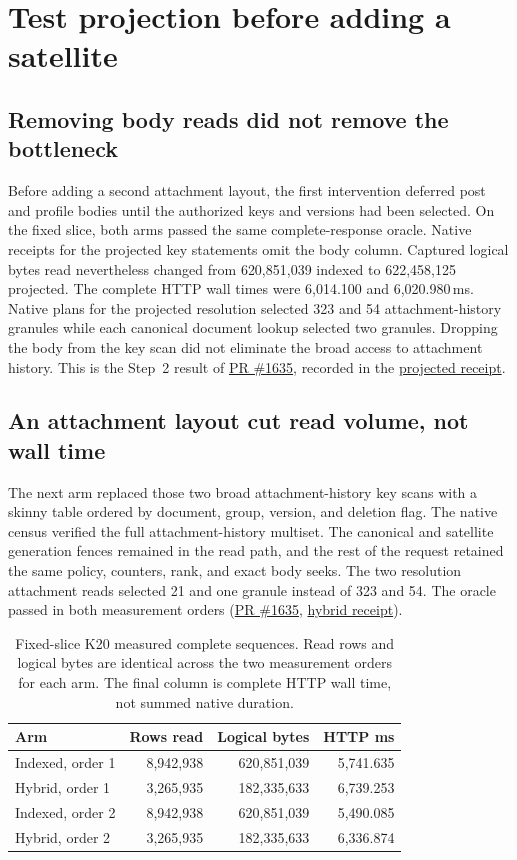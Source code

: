 \documentclass[sigconf,nonacm]{acmart}
\newcommand{\pr}[1]{\href{https://github.com/jacoby149/web10/pull/#1}{PR \##1}}
\newcommand{\record}[2]{\href{https://github.com/jacoby149/web10/blob/2f397cb13/research/experiments/costfn/#1}{#2}}
\begin{document}
\section{Test projection before adding a satellite}
\subsection{Removing body reads did not remove the bottleneck}
Before adding a second attachment layout, the first intervention deferred post and profile bodies until the authorized keys and versions had been selected. On the fixed slice, both arms passed the same complete-response oracle. Native receipts for the projected key statements omit the body column. Captured logical bytes read nevertheless changed from 620,851,039 indexed to 622,458,125 projected. The complete HTTP wall times were 6,014.100 and 6,020.980\,ms. Native plans for the projected resolution selected 323 and 54 attachment-history granules while each canonical document lookup selected two granules. Dropping the body from the key scan did not eliminate the broad access to attachment history. This is the Step~2 result of \pr{1635}, recorded in the \record{evidence/k20-projected-20261125/RESULTS.md}{projected receipt}.

\subsection{An attachment layout cut read volume, not wall time}
The next arm replaced those two broad attachment-history key scans with a skinny table ordered by document, group, version, and deletion flag. The native census verified the full attachment-history multiset. The canonical and satellite generation fences remained in the read path, and the rest of the request retained the same policy, counters, rank, and exact body seeks. The two resolution attachment reads selected 21 and one granule instead of 323 and 54. The oracle passed in both measurement orders (\pr{1635}, \record{evidence/k20-attachment-20261125/RESULTS.md}{hybrid receipt}).

\begin{table}[t]
\caption{Fixed-slice K20 measured complete sequences. Read rows and logical bytes are identical across the two measurement orders for each arm. The final column is complete HTTP wall time, not summed native duration.}
\label{tab:hybrid}
\small
\setlength{\tabcolsep}{4pt}
\begin{tabular}{@{}lrrr@{}}
\toprule
Arm & Rows read & Logical bytes & HTTP ms \\
\midrule
Indexed, order 1 & 8,942,938 & 620,851,039 & 5,741.635 \\
Hybrid, order 1 & 3,265,935 & 182,335,633 & 6,739.253 \\
Indexed, order 2 & 8,942,938 & 620,851,039 & 5,490.085 \\
Hybrid, order 2 & 3,265,935 & 182,335,633 & 6,336.874 \\
\bottomrule
\end{tabular}
\end{table}
\end{document}

